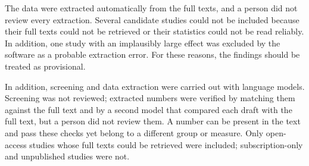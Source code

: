 \documentclass[man,a4paper,12pt,floatsintext,nolmodern,notab]{apa7}
\begin{document}
The data were extracted automatically from the full texts, and a person did not review every extraction. Several candidate studies could not be included because their full texts could not be retrieved or their statistics could not be read reliably. In addition, one study with an implausibly large effect was excluded by the software as a probable extraction error. For these reasons, the findings should be treated as provisional.

In addition, screening and data extraction were carried out with language models. Screening was not reviewed; extracted numbers were verified by matching them against the full text and by a second model that compared each draft with the full text, but a person did not review them. A number can be present in the text and pass these checks yet belong to a different group or measure. Only open-access studies whose full texts could be retrieved were included; subscription-only and unpublished studies were not.
\end{document}
